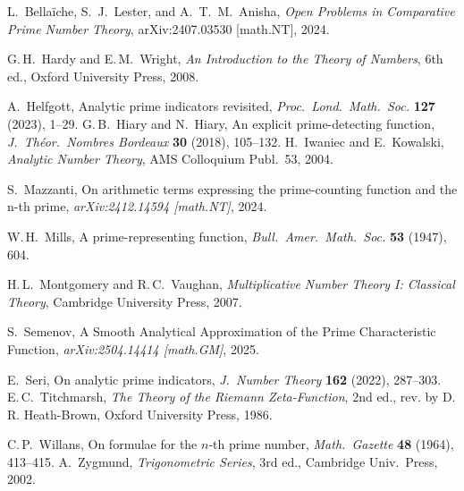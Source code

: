 \documentclass[11pt,a4paper]{amsart}
\theoremstyle{plain}
\theoremstyle{definition}
\begin{document}
\begin{thebibliography}{13}

L.~Bellaïche, S.~J.~Lester, and A.~T.~M.~Anisha, \emph{Open Problems in Comparative Prime Number Theory}, arXiv:2407.03530 [math.NT], 2024.

G.\,H.~Hardy and E.\,M.~Wright, \emph{An Introduction to the Theory of Numbers}, 6th ed., Oxford University Press, 2008.

A.~Helfgott, Analytic prime indicators revisited, \emph{Proc.\ Lond.\ Math.\ Soc.} \textbf{127} (2023), 1–29.
G.\,B.~Hiary and N.~Hiary, An explicit prime-detecting function, \emph{J.\ Théor.\ Nombres Bordeaux} \textbf{30} (2018), 105–132.
H.~Iwaniec and E.~Kowalski, \emph{Analytic Number Theory}, AMS Colloquium Publ.\ 53, 2004.

S.~Mazzanti, On arithmetic terms expressing the prime-counting function and the n-th prime, \emph{arXiv:2412.14594 [math.NT]}, 2024.

W.\,H.~Mills, A prime-representing function, \emph{Bull.\ Amer.\ Math.\ Soc.} \textbf{53} (1947), 604.

H.\,L.~Montgomery and R.\,C.~Vaughan, \emph{Multiplicative Number Theory I: Classical Theory}, Cambridge University Press, 2007.

S.~Semenov, A Smooth Analytical Approximation of the Prime Characteristic Function, \emph{arXiv:2504.14414 [math.GM]}, 2025.

E.~Seri, On analytic prime indicators, \emph{J.\ Number Theory} \textbf{162} (2022), 287–303.
E.\,C.~Titchmarsh, \emph{The Theory of the Riemann Zeta-Function}, 2nd ed., rev. by D. R. Heath-Brown, Oxford University Press, 1986.

C.\,P.~Willans, On formulae for the $n$-th prime number, \emph{Math.\ Gazette} \textbf{48} (1964), 413–415.
A.~Zygmund, \emph{Trigonometric Series}, 3rd ed., Cambridge Univ.\ Press, 2002.

\end{thebibliography}
\end{document}
